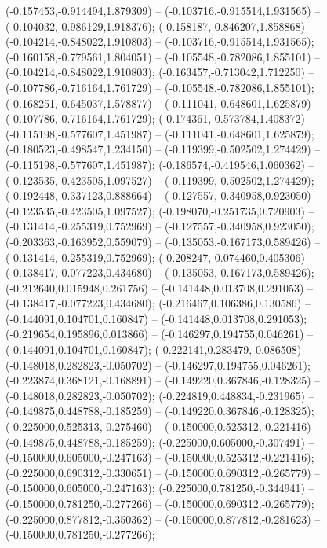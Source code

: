  (-0.157453,-0.914494,1.879309) -- (-0.103716,-0.915514,1.931565) -- (-0.104032,-0.986129,1.918376);
 (-0.158187,-0.846207,1.858868) -- (-0.104214,-0.848022,1.910803) -- (-0.103716,-0.915514,1.931565);
 (-0.160158,-0.779561,1.804051) -- (-0.105548,-0.782086,1.855101) -- (-0.104214,-0.848022,1.910803);
 (-0.163457,-0.713042,1.712250) -- (-0.107786,-0.716164,1.761729) -- (-0.105548,-0.782086,1.855101);
 (-0.168251,-0.645037,1.578877) -- (-0.111041,-0.648601,1.625879) -- (-0.107786,-0.716164,1.761729);
 (-0.174361,-0.573784,1.408372) -- (-0.115198,-0.577607,1.451987) -- (-0.111041,-0.648601,1.625879);
 (-0.180523,-0.498547,1.234150) -- (-0.119399,-0.502502,1.274429) -- (-0.115198,-0.577607,1.451987);
 (-0.186574,-0.419546,1.060362) -- (-0.123535,-0.423505,1.097527) -- (-0.119399,-0.502502,1.274429);
 (-0.192448,-0.337123,0.888664) -- (-0.127557,-0.340958,0.923050) -- (-0.123535,-0.423505,1.097527);
 (-0.198070,-0.251735,0.720903) -- (-0.131414,-0.255319,0.752969) -- (-0.127557,-0.340958,0.923050);
 (-0.203363,-0.163952,0.559079) -- (-0.135053,-0.167173,0.589426) -- (-0.131414,-0.255319,0.752969);
 (-0.208247,-0.074460,0.405306) -- (-0.138417,-0.077223,0.434680) -- (-0.135053,-0.167173,0.589426);
 (-0.212640,0.015948,0.261756) -- (-0.141448,0.013708,0.291053) -- (-0.138417,-0.077223,0.434680);
 (-0.216467,0.106386,0.130586) -- (-0.144091,0.104701,0.160847) -- (-0.141448,0.013708,0.291053);
 (-0.219654,0.195896,0.013866) -- (-0.146297,0.194755,0.046261) -- (-0.144091,0.104701,0.160847);
 (-0.222141,0.283479,-0.086508) -- (-0.148018,0.282823,-0.050702) -- (-0.146297,0.194755,0.046261);
 (-0.223874,0.368121,-0.168891) -- (-0.149220,0.367846,-0.128325) -- (-0.148018,0.282823,-0.050702);
 (-0.224819,0.448834,-0.231965) -- (-0.149875,0.448788,-0.185259) -- (-0.149220,0.367846,-0.128325);
 (-0.225000,0.525313,-0.275460) -- (-0.150000,0.525312,-0.221416) -- (-0.149875,0.448788,-0.185259);
 (-0.225000,0.605000,-0.307491) -- (-0.150000,0.605000,-0.247163) -- (-0.150000,0.525312,-0.221416);
 (-0.225000,0.690312,-0.330651) -- (-0.150000,0.690312,-0.265779) -- (-0.150000,0.605000,-0.247163);
 (-0.225000,0.781250,-0.344941) -- (-0.150000,0.781250,-0.277266) -- (-0.150000,0.690312,-0.265779);
 (-0.225000,0.877812,-0.350362) -- (-0.150000,0.877812,-0.281623) -- (-0.150000,0.781250,-0.277266);
